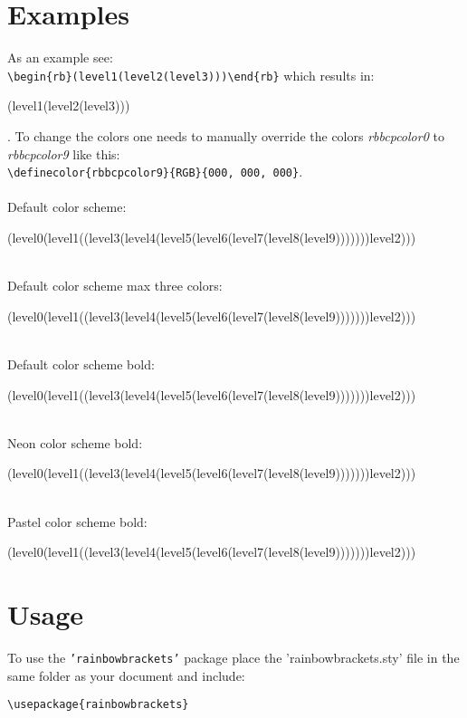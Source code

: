 \documentclass[10pt, a4paper]{article}
\begin{document}
	\section{Examples}
	As an example see: \\\verb=\begin{rb}(level1(level2(level3)))\end{rb}= which results in: \begin{rb}(level1(level2(level3)))\end{rb}.
	To change the colors one needs to manually override the colors \textit{rbbcpcolor0} to \textit{rbbcpcolor9} like this: \\\verb=\definecolor{rbbcpcolor9}{RGB}{000, 000, 000}=.
	\\\ \\Default color scheme: \\\begin{rb}(level0(level1((level3(level4(level5(level6(level7(level8(level9)))))))level2)))\end{rb}
	\\Default color scheme max three colors: \\\begin{rb}(level0(level1((level3(level4(level5(level6(level7(level8(level9)))))))level2)))\end{rb}
	\resetrainbowbracketmax
	\\Default color scheme bold: 
	\\\begin{rB}(level0(level1((level3(level4(level5(level6(level7(level8(level9)))))))level2)))\end{rB}
	\\Neon color scheme bold: 
	\\\begin{rB}(level0(level1((level3(level4(level5(level6(level7(level8(level9)))))))level2)))\end{rB}
	\\Pastel color scheme bold: 
	\\\begin{rB}(level0(level1((level3(level4(level5(level6(level7(level8(level9)))))))level2)))\end{rB}
	\resetrbstyle
	\section{Usage}
	To use the \texttt{'rainbowbrackets'} package place the 'rainbowbrackets.sty' file in the same folder as your document and include:
	\begin{lstlisting}[style=A]
			\usepackage{rainbowbrackets}
	\end{lstlisting}
\end{document}
